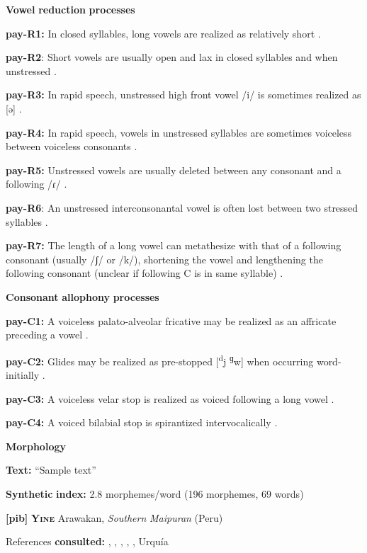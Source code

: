 \textbf{Vowel} \textbf{reduction} \textbf{processes}

\textbf{pay-R1:} In closed syllables, long vowels are realized as relatively short \citep[18]{Holt1999}.

\textbf{pay-R2}: Short vowels are usually open and lax in closed syllables and when unstressed \citep[18]{Holt1999}.

\textbf{pay-R3:} In rapid speech, unstressed high front vowel /i/ is sometimes realized as [ə] \citep[18]{Holt1999}.

\textbf{pay-R4:} In rapid speech, vowels in unstressed syllables are sometimes voiceless between voiceless consonants \citep[18]{Holt1999}.

\textbf{pay-R5:} Unstressed vowels are usually deleted between any consonant and a following /ɾ/ \citep[23]{Holt1999}.

\textbf{pay-R6}: An unstressed interconsonantal vowel is often lost between two stressed syllables \citep[23]{Holt1999}.

\textbf{pay-R7:} The length of a long vowel can metathesize with that of a following consonant (usually /ʃ/ or /k/), shortening the vowel and lengthening the following consonant (unclear if following C is in same syllable) \citep[24-5]{Holt1999}.

\textbf{Consonant} \textbf{allophony} \textbf{processes}

\textbf{pay-C1:} A voiceless palato-alveolar fricative may be realized as an affricate preceding a vowel \citep[16]{Holt1999}.

\textbf{pay-C2:} Glides may be realized as pre-stopped [\textsuperscript{d}j \textsuperscript{ɡ}w] when occurring word-initially \citep[16]{Holt1999}.

\textbf{pay-C3:} A voiceless velar stop is realized as voiced following a long vowel \citep[15-16]{Holt1999}.

\textbf{pay-C4:} A voiced bilabial stop is spirantized intervocalically \citep[16]{Holt1999}.

\textbf{Morphology}

\textbf{Text:} “Sample text” \citep[79-80]{Holt1999}

\textbf{Synthetic} \textbf{index:} 2.8 morphemes/word (196 morphemes, 69 words)

\textbf{[pib]}   \textbf{\textsc{Yine}}  Arawakan, \textit{Southern} \textit{Maipuran} (Peru)

References \textbf{consulted:} \citet{Hanson2010}, \citet{Lin1993}, \citet{Lin1997}, \citet{Matteson1965}, \citet{Parker1989}, Urquía \citet{SebastiánMarlett2008}

